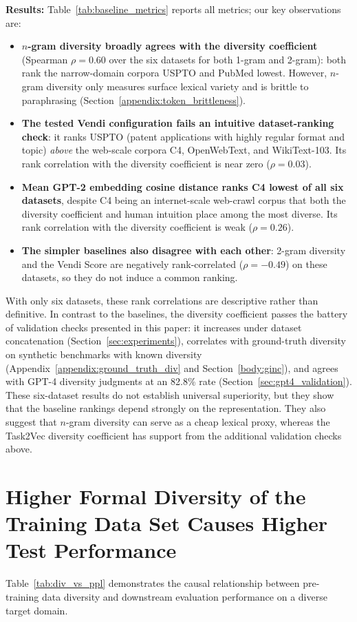 \textbf{Results:}
Table~\ref{tab:baseline_metrics} reports all metrics; our key observations are:
\begin{itemize}
    \item \textbf{$n$-gram diversity broadly agrees with the diversity coefficient} (Spearman $\rho = 0.60$ over the six datasets for both 1-gram and 2-gram): both rank the narrow-domain corpora USPTO and PubMed lowest.
    However, $n$-gram diversity only measures surface lexical variety and is brittle to paraphrasing (Section~\ref{appendix:token_brittleness}).
    \item \textbf{The tested Vendi configuration fails an intuitive dataset-ranking check}: it ranks USPTO (patent applications with highly regular format and topic) \emph{above} the web-scale corpora C4, OpenWebText, and WikiText-103.
    Its rank correlation with the diversity coefficient is near zero ($\rho = 0.03$).
    \item \textbf{Mean GPT-2 embedding cosine distance ranks C4 lowest of all six datasets}, despite C4 being an internet-scale web-crawl corpus that both the diversity coefficient and human intuition place among the most diverse.
    Its rank correlation with the diversity coefficient is weak ($\rho = 0.26$).
    \item \textbf{The simpler baselines also disagree with each other}: 2-gram diversity and the Vendi Score are negatively rank-correlated ($\rho = -0.49$) on these datasets, so they do not induce a common ranking.
\end{itemize}
With only six datasets, these rank correlations are descriptive rather than definitive.
In contrast to the baselines, the diversity coefficient passes the battery of validation checks presented in this paper: it increases under dataset concatenation (Section~\ref{sec:experiments}), correlates with ground-truth diversity on synthetic benchmarks with known diversity (Appendix~\ref{appendix:ground_truth_div} and Section~\ref{body:ginc}), and agrees with GPT-4 diversity judgments at an 82.8\% rate (Section~\ref{sec:gpt4_validation}).
These six-dataset results do not establish universal superiority, but they show that the baseline rankings depend strongly on the representation.
They also suggest that $n$-gram diversity can serve as a cheap lexical proxy, whereas the Task2Vec diversity coefficient has support from the additional validation checks above.

\section{Higher Formal Diversity of the Training Data Set Causes Higher Test Performance}
Table~\ref{tab:div_vs_ppl} demonstrates the causal relationship between pre-training data diversity and downstream evaluation performance on a diverse target domain. 

